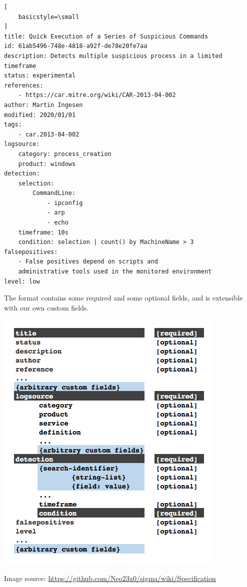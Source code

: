 \begin{lstlisting}[
    basicstyle=\small
]
title: Quick Execution of a Series of Suspicious Commands
id: 61ab5496-748e-4818-a92f-de78e20fe7aa
description: Detects multiple suspicious process in a limited timeframe
status: experimental
references:
    - https://car.mitre.org/wiki/CAR-2013-04-002
author: Martin Ingesen
modified: 2020/01/01
tags:
    - car.2013-04-002
logsource:
    category: process_creation
    product: windows
detection:
    selection:
        CommandLine:
            - ipconfig
            - arp
            - echo
    timeframe: 10s
    condition: selection | count() by MachineName > 3
falsepositives:
    - False positives depend on scripts and
    administrative tools used in the monitored environment
level: low
\end{lstlisting}
The format contains some required and some optional fields, and is extensible with our own custom fields.

\includegraphics[scale=0.525]{figures/new-rule-format/Sigma_Schema.png}

Image source: \url{https://github.com/Neo23x0/sigma/wiki/Specification}